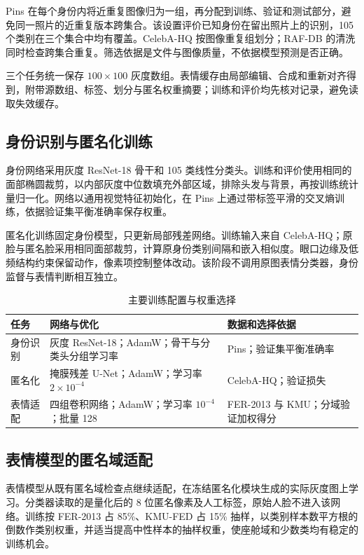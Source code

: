 Pins 在每个身份内将近重复图像归为一组，再分配到训练、验证和测试部分，避免同一照片的近重复版本跨集合。该设置评价已知身份在留出照片上的识别，105 个类别在三个集合中均有覆盖。CelebA-HQ 按图像重复组划分；RAF-DB 的清洗同时检查跨集合重复。筛选依据是文件与图像质量，不依据模型预测是否正确。

三个任务统一保存 $100\times100$ 灰度数组。表情缓存由局部编辑、合成和重新对齐得到，附带源数组、标签、划分与匿名权重摘要；训练和评价均先核对记录，避免读取失效缓存。

\subsection{身份识别与匿名化训练}
身份网络采用灰度 ResNet-18 骨干和 105 类线性分类头。训练和评价使用相同的面部椭圆裁剪，以内部灰度中位数填充外部区域，排除头发与背景，再按训练统计量归一化。网络以通用视觉特征初始化，在 Pins 上通过带标签平滑的交叉熵训练，依据验证集平衡准确率保存权重。

匿名化训练固定身份模型，只更新局部残差网络。训练输入来自 CelebA-HQ；原脸与匿名脸采用相同面部裁剪，计算原身份类别间隔和嵌入相似度。眼口边缘及低频结构约束保留动作，像素项控制整体改动。该阶段不调用原图表情分类器，身份监督与表情判断相互独立。

\begin{table}[htbp]
\centering
\caption{主要训练配置与权重选择}
\label{tab:training}
\begin{tabularx}{\linewidth}{@{}lXX@{}}
\toprule
任务 & 网络与优化 & 数据和选择依据\\
\midrule
身份识别 & 灰度 ResNet-18；AdamW；骨干与分类头分组学习率 & Pins；验证集平衡准确率\\
匿名化 & 掩膜残差 U-Net；AdamW；学习率 $2\times10^{-4}$ & CelebA-HQ；验证损失\\
表情适配 & 四组卷积网络；AdamW；学习率 $10^{-4}$；批量 128 & FER-2013 与 KMU；分域验证加权得分\\
\bottomrule
\end{tabularx}
\end{table}

\subsection{表情模型的匿名域适配}
表情模型从既有匿名域检查点继续适配，在冻结匿名化模块生成的实际灰度图上学习。分类器读取的是量化后的 $8$ 位匿名像素及人工标签，原始人脸不进入该网络。训练按 FER-2013 占 85\%、KMU-FED 占 15\% 抽样，以类别样本数平方根的倒数作类别权重，并适当提高中性样本的抽样权重，使座舱域和少数类均有稳定的训练机会。

